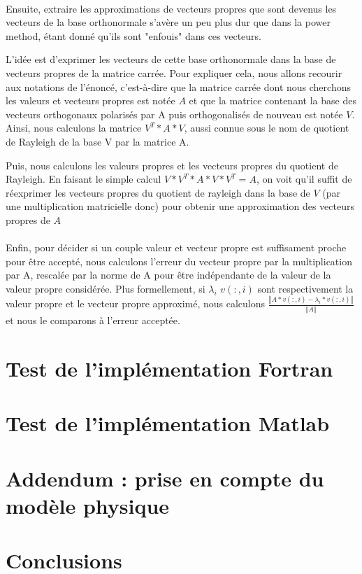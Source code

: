 \documentclass[a4paper,12pt]{article}
\newcommand{\norme}[1]{\left\Vert #1\right\Vert}
\begin{document}
    \paragraph{}
    Ensuite, extraire les approximations de vecteurs propres que sont devenus
    les vecteurs de la base orthonormale s'avère un peu plus dur que dans la
    power method, étant donné qu'ils sont "enfouis" dans ces vecteurs.

    L'idée est d'exprimer les vecteurs de cette base orthonormale dans la
    base de vecteurs propres de la matrice carrée. Pour expliquer cela, nous
    allons recourir aux notations de l'énoncé, c'est-à-dire que la matrice
    carrée dont nous cherchons les valeurs et vecteurs propres est notée $A$
    et que la matrice contenant la base des vecteurs orthogonaux polarisés
    par A puis orthogonalisés de nouveau est notée $V$. Ainsi, nous calculons
    la matrice $V^T*A*V$, aussi connue sous le nom de quotient de Rayleigh de
    la base V par la matrice A.

    Puis, nous calculons les valeurs propres et les vecteurs propres du quotient
    de Rayleigh. En faisant le simple calcul $V*V^T*A*V*V^T = A$, on voit qu'il
    suffit de réexprimer les vecteurs propres du quotient de rayleigh dans la base
    de $V$ (par une multiplication matricielle donc) pour obtenir une approximation
    des vecteurs propres de $A$

    \paragraph{}
    Enfin, pour décider si un couple valeur et vecteur propre est suffisament proche
    pour être accepté, nous calculons l'erreur du vecteur propre par la multiplication
    par A, rescalée par la norme de A pour être indépendante de la valeur de la
    valeur propre considérée. Plus formellement, si $\lambda_i$ $v(:,i)$ sont
    respectivement la valeur propre et le vecteur propre approximé, nous calculons
    $\frac{\norme{A*v(:,i) - \lambda_i*v(:,i)}}{\norme{A}}$ et nous le comparons
    à l'erreur acceptée.


\section{Test de l'implémentation Fortran}

\section{Test de l'implémentation Matlab}

\section{Addendum : prise en compte du modèle physique}

\section{Conclusions}
\end{document}
